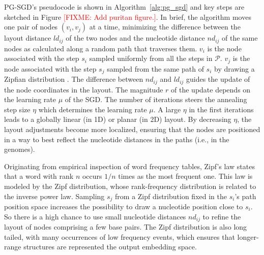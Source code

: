 \documentclass{bioinfo}
\theoremstyle{definition}
\newcommand{\red}[1]{{\textcolor{Red}{#1}}}
\newcommand{\FIXME}[1]{\red{[FIXME: #1]}}
\begin{document}
	PG-SGD's pseudocode is shown in Algorithm~\ref{alg:pg_sgd} and key steps are sketched in Figure \FIXME{Add puritan figure.}.
	In brief, the algorithm moves one pair of nodes $( v_i, v_j )$ at a time, minimizing the difference between the layout distance $ld_{ij}$ of the two nodes and the nucleotide distance $nd_{ij}$ of the same nodes as calculated along a random path that traverses them.
	$v_i$ is the node associated with the step $s_i$ sampled uniformly from all the steps in $\mathcal{P}$.
	$v_j$ is the node associated with the step $s_j$ sampled from the same path of $s_i$ by drawing a Zipfian distribution \citep{Zipf1932}.
	The difference between $nd_{ij}$ and $ld_{ij}$ guides the update of the node coordinates in the layout.
	The magnitude $r$ of the update depends on the learning rate $\mu$ of the SGD.
	The number of iterations steers the annealing step size $\eta$ which determines the learning rate $\mu$.
	A large $\eta$ in the first iterations leads to a globally linear (in 1D) or planar (in 2D) layout.
	By decreasing $\eta$, the layout adjustments become more localized, ensuring that the nodes are positioned in a way to best reflect the nucleotide distances in the paths (i.e., in the genomes). %
	
	


	Originating from empirical inspection of word frequency tables, Zipf's law states that a word with rank $n$ occurs $1/n$ times as the most frequent one.
    This law is modeled by the Zipf distribution, whose rank-frequency distribution is related to the inverse power law. %
	Sampling $s_j$ from a Zipf distribution fixed in the $s_i$'s path position space increases the possibility to draw a nucleotide position close to $s_i$.
	So there is a high chance to use small nucleotide distances $nd_{ij}$ to refine the layout of nodes comprising a few base pairs.
    The Zipf distribution is also long tailed, with many occurrences of low frequency events, which ensures that longer-range structures are represented the output embedding space.
\end{document}
